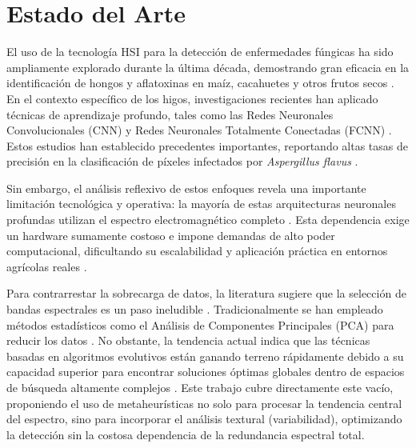 \chapter{Estado del Arte}

El uso de la tecnología HSI para la detección de enfermedades fúngicas ha sido ampliamente explorado durante la última década, demostrando gran eficacia en la identificación de hongos y aflatoxinas en maíz, cacahuetes y otros frutos secos \cite{park_hyperspectral_2015, cruz-carrasco_detection_2024}. En el contexto específico de los higos, investigaciones recientes han aplicado técnicas de aprendizaje profundo, tales como las Redes Neuronales Convolucionales (CNN) y Redes Neuronales Totalmente Conectadas (FCNN) \cite{cruz-carrasco_detection_2024}. Estos estudios han establecido precedentes importantes, reportando altas tasas de precisión en la clasificación de píxeles infectados por \textit{Aspergillus flavus} \cite{cruz-carrasco_detection_2024}.

Sin embargo, el análisis reflexivo de estos enfoques revela una importante limitación tecnológica y operativa: la mayoría de estas arquitecturas neuronales profundas utilizan el espectro electromagnético completo \cite{sawant_survey_2020}. Esta dependencia exige un hardware sumamente costoso e impone demandas de alto poder computacional, dificultando su escalabilidad y aplicación práctica en entornos agrícolas reales \cite{sawant_survey_2020}. 

Para contrarrestar la sobrecarga de datos, la literatura sugiere que la selección de bandas espectrales es un paso ineludible \cite{sawant_survey_2020}. Tradicionalmente se han empleado métodos estadísticos como el Análisis de Componentes Principales (PCA) para reducir los datos \cite{chu_classifying_2020}. No obstante, la tendencia actual indica que las técnicas basadas en algoritmos evolutivos están ganando terreno rápidamente debido a su capacidad superior para encontrar soluciones óptimas globales dentro de espacios de búsqueda altamente complejos \cite{sawant_survey_2020}. Este trabajo cubre directamente este vacío, proponiendo el uso de metaheurísticas no solo para procesar la tendencia central del espectro, sino para incorporar el análisis textural (variabilidad), optimizando la detección sin la costosa dependencia de la redundancia espectral total.
